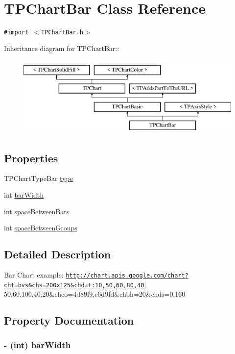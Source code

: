 \hypertarget{interface_t_p_chart_bar}{
\section{TPChartBar Class Reference}
\label{interface_t_p_chart_bar}
}
{\tt \#import $<$TPChartBar.h$>$}

Inheritance diagram for TPChartBar::\begin{figure}[H]
\begin{center}
\leavevmode
\includegraphics[height=4cm]{interface_t_p_chart_bar}
\end{center}
\end{figure}
\subsection*{Properties}
\begin{CompactItemize}
\item 
TPChartTypeBar \hyperlink{interface_t_p_chart_bar_a6097d677c850f54a0e8a513356130d0}{type}
\item 
int \hyperlink{interface_t_p_chart_bar_e3b51efd638c009a91ab1b818f3dc165}{barWidth}
\item 
int \hyperlink{interface_t_p_chart_bar_8ec908b88d8db83273578b53002f654d}{spaceBetweenBars}
\item 
int \hyperlink{interface_t_p_chart_bar_2a66eac7dcb2b1f2445275af97d1955e}{spaceBetweenGroups}
\end{CompactItemize}


\subsection{Detailed Description}
Bar Chart example: \href{http://chart.apis.google.com/chart?cht=bvs&chs=200x125&chd=t:10,50,60,80,40}{\tt http://chart.apis.google.com/chart?cht=bvs\&chs=200x125\&chd=t:10,50,60,80,40}$|$50,60,100,40,20\&chco=4d89f9,c6d9fd\&chbh=20\&chds=0,160 

\subsection{Property Documentation}
\hypertarget{interface_t_p_chart_bar_e3b51efd638c009a91ab1b818f3dc165}{
\subsubsection[{barWidth}]{\setlength{\rightskip}{0pt plus 5cm}- (int) barWidth}}
\label{interface_t_p_chart_bar_e3b51efd638c009a91ab1b818f3dc165}


